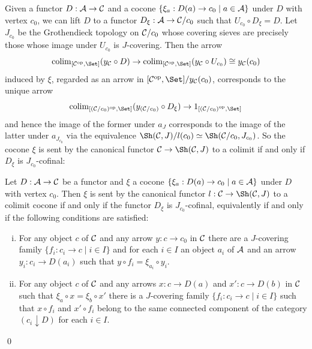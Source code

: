 \documentclass[a4paper,12pt]{article}
\begin{document}
Given a functor $D:{\cal A}\to {\cal C}$ and a cocone $\{\xi_{a}: D(a)\to c_{0} \mid a\in {\cal A}\}$ under $D$ with vertex $c_{0}$, we can lift $D$ to a functor $D_{\xi}:{\cal A}\to {\cal C}\slash c_{0}$ such that $U_{c_{0}}\circ D_{\xi}=D$. Let $J_{c_{0}}$ be the Grothendieck topology on ${\cal C}\slash c_{0}$ whose covering sieves are precisely those whose image under $U_{c_{0}}$ is $J$-covering. Then the arrow
\[
\textup{colim}_{[{\cal C}^{\textup{op}}, \Set]}(y_{\cal C}\circ D) \to \textup{colim}_{[{\cal C}^{\textup{op}}, \Set]}(y_{\cal C}\circ U_{c_{0}})\cong y_{\cal C}(c_{0})
\]
induced by $\xi$, regarded as an arrow in $[{\cal C}^{\textup{op}}, \Set] \slash y_{\cal C}(c_{0})$, corresponds to the unique arrow
\[
\textup{colim}_{[({{\cal C}\slash c_{0}})^{\textup{op}}, \Set]}(y_{({\cal C}\slash c_{0})}\circ D_{\xi}) \to 
1_{[{({\cal C}\slash c_{0})}^{\textup{op}}, \Set]} 
\] 
and hence the image of the former under $a_{J}$ corresponds to the image of the latter under $a_{J_{c_{0}}}$ via the equivalence $\Sh({\cal C}, J)\slash l(c_{0}) \simeq \Sh({\cal C}\slash c_{0}, J_{c_{0}})$. So the cocone $\xi$ is sent by the canonical functor ${\cal C}\to \Sh({\cal C}, J)$ to a colimit if and only if $D_{\xi}$ is $J_{c_{0}}$-cofinal:

\begin{corollary}\label{corcolimitintopos}
	Let $D:{\cal A}\to {\cal C}$ be a functor and $\xi$ a cocone $\{\xi_{a}: D(a)\to c_{0} \mid a\in {\cal A}\}$ under $D$ with vertex $c_{0}$. Then $\xi$ is sent by the canonical functor $l:{\cal C}\to \Sh({\cal C}, J)$ to a colimit cocone if and only if the functor $D_{\xi}$ is $J_{c_{0}}$-cofinal, equivalently if and only if the following conditions are satisfied:
	\begin{enumerate}[(i)]
		\item For any object $c$ of $\cal C$ and any arrow $y:c\to c_{0}$ in $\cal C$ there are a $J$-covering family $\{f_i: c_i \to c \mid i\in I\}$ and for each $i\in I$ an object $a_{i}$ of $\cal A$ and an arrow $y_i:c_{i}\to D(a_{i})$ such that $y\circ f_{i}=\xi_{a_{i}}\circ y_{i}$.
		
		\item For any object $c$ of $\cal C$ and any arrows $x:c\to D(a)$ and $x':c\to D(b)$ in $\cal C$ such that $\xi_{a}\circ x= \xi_{b}\circ x'$ there is a $J$-covering family $\{f_i: c_i \to c \mid i\in I\}$ such that $x\circ f_i$ and $x'\circ f_i$ belong to the same connected component of the category $(c_{i} \downarrow D)$ for each $i\in I$. 
	\end{enumerate}		
\end{corollary}\qed
\end{document}
